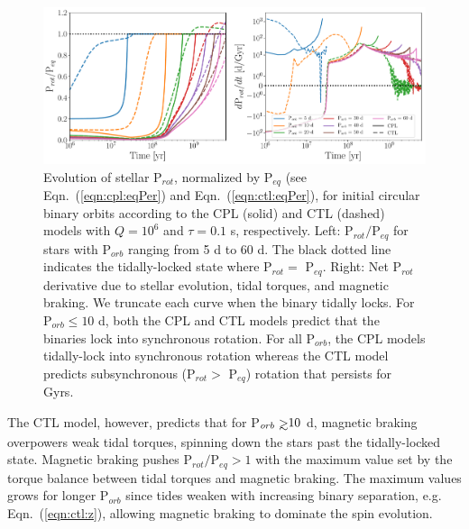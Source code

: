 \documentclass[twocolumn]{aastex61}
\def\gsim{~\rlap{$>$}{\lower 1.0ex\hbox{$\sim$}}}
\begin{document}
\begin{figure}
	\includegraphics[width=\textwidth]{../Plots/eqPerTwoPanel.pdf}
   \caption{Evolution of stellar P$_{rot}$, normalized by P$_{eq}$ (see Eqn.~(\ref{eqn:cpl:eqPer}) and Eqn.~(\ref{eqn:ctl:eqPer}), for initial circular binary orbits according to the CPL (solid) and CTL (dashed) models with $Q = 10^6$ and $\tau = 0.1$ s, respectively. Left: P$_{rot}/$P$_{eq}$ for stars with P$_{orb}$ ranging from 5 d to 60 d. The black dotted line indicates the tidally-locked state where P$_{rot} = $ P$_{eq}$.  Right: Net P$_{rot}$ derivative due to stellar evolution, tidal torques, and magnetic braking.  We truncate each curve when the binary tidally locks. For P$_{orb} \leq 10$ d, both the CPL and CTL models predict that the binaries lock into synchronous rotation.  For all P$_{orb}$, the CPL models tidally-lock into synchronous rotation whereas the CTL model predicts subsynchronous (P$_{rot} > $ P$_{eq}$) rotation that persists for Gyrs.}%
    \label{fig:eqPer}%
\end{figure}


The CTL model, however, predicts that for P$_{orb} \gsim 10$ d, magnetic braking overpowers weak tidal torques, spinning down the stars past the tidally-locked state. Magnetic braking pushes P$_{rot}/$P$_{eq} > 1$ with the maximum value set by the torque balance between tidal torques and magnetic braking. The maximum values grows for longer P$_{orb}$ since tides weaken with increasing binary separation, e.g. Eqn.~(\ref{eqn:ctl:z}), allowing magnetic braking to dominate the spin evolution. 
\end{document}
